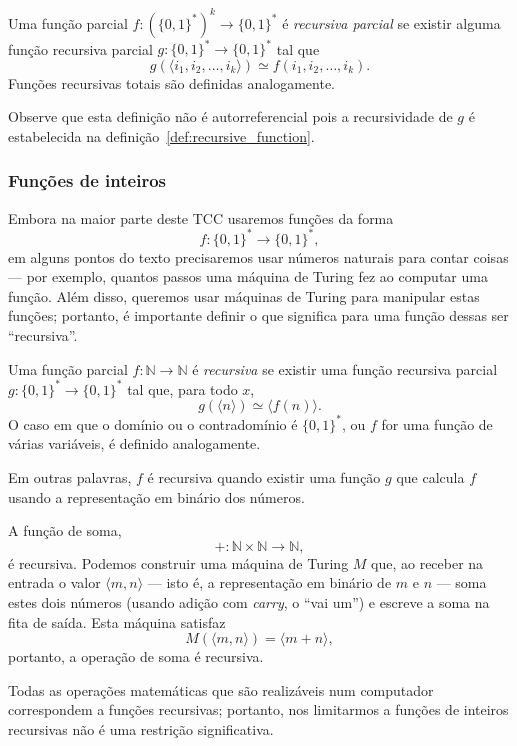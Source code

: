 \begin{definition}
    \label{def:multi_valued_recursive_function}
    Uma função parcial $f: (\{0, 1\}^*)^k \to \{0, 1\}^*$ é \emph{recursiva parcial}
    se existir alguma função recursiva parcial $g: \{0, 1\}^* \to \{0, 1\}^*$
    tal que
    \begin{equation*}
        g(\langle i_1, i_2, \dots, i_k \rangle) \simeq f(i_1, i_2, \dots, i_k).
    \end{equation*}
    Funções recursivas totais são definidas analogamente.
\end{definition}

Observe que esta definição não é autorreferencial
pois a recursividade de $g$ é estabelecida na definição~\ref{def:recursive_function}.

\subsubsection{Funções de inteiros}

Embora na maior parte deste TCC usaremos funções da forma
\begin{equation*}
    f : \{0, 1\}^* \to \{0, 1\}^*,
\end{equation*}
em alguns pontos do texto precisaremos usar números naturais para contar coisas
--- por exemplo,
quantos passos uma máquina de Turing fez ao computar uma função.
Além disso,
queremos usar máquinas de Turing para manipular estas funções;
portanto,
é importante definir o que significa para uma função dessas ser ``recursiva''.

\begin{definition}
    Uma função parcial $f: \mathbb N \to \mathbb N$ é \emph{recursiva}
    se existir uma função recursiva parcial $g: \{0, 1\}^* \to \{0, 1\}^*$
    tal que, para todo $x$,
    \begin{equation*}
        g(\langle n \rangle) \simeq \langle f(n) \rangle.
    \end{equation*}
    O caso em que o domínio ou o contradomínio é $\{0, 1\}^*$,
    ou $f$ for uma função de várias variáveis,
    é definido analogamente.
\end{definition}

Em outras palavras,
$f$ é recursiva quando existir uma função $g$
que calcula $f$ usando a representação em binário dos números.

\begin{example}
    A função de soma,
    \begin{equation*}
        +: \mathbb N \times \mathbb N \to \mathbb N,
    \end{equation*}
    é recursiva.
    Podemos construir uma máquina de Turing $M$ que,
    ao receber na entrada o valor $\langle m, n \rangle$
    --- isto é, a representação em binário de $m$ e $n$ ---
    soma estes dois números
    (usando adição com \emph{carry}, o ``vai um'')
    e escreve a soma na fita de saída.
    Esta máquina satisfaz
    \begin{equation*}
        M(\langle m, n \rangle) = \langle m+n \rangle,
    \end{equation*}
    portanto, a operação de soma é recursiva.
\end{example}

Todas as operações matemáticas que são realizáveis num computador
correspondem a funções recursivas;
portanto,
nos limitarmos a funções de inteiros recursivas não é uma restrição significativa.
